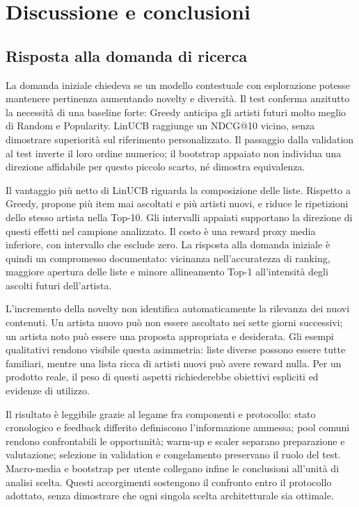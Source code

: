 \chapter{Discussione e conclusioni}\label{ch:conclusioni}
\section{Risposta alla domanda di ricerca}
La domanda iniziale chiedeva se un modello contestuale con esplorazione potesse mantenere pertinenza aumentando novelty e diversità. Il test conferma anzitutto la necessità di una baseline forte: Greedy anticipa gli artisti futuri molto meglio di Random e Popularity. LinUCB raggiunge un NDCG@10 vicino, senza dimostrare superiorità sul riferimento personalizzato. Il passaggio dalla validation al test inverte il loro ordine numerico; il bootstrap appaiato non individua una direzione affidabile per questo piccolo scarto, né dimostra equivalenza.

Il vantaggio più netto di LinUCB riguarda la composizione delle liste. Rispetto a Greedy, propone più item mai ascoltati e più artisti nuovi, e riduce le ripetizioni dello stesso artista nella Top-10. Gli intervalli appaiati supportano la direzione di questi effetti nel campione analizzato. Il costo è una reward proxy media inferiore, con intervallo che esclude zero. La risposta alla domanda iniziale è quindi un compromesso documentato: vicinanza nell'accuratezza di ranking, maggiore apertura delle liste e minore allineamento Top-1 all'intensità degli ascolti futuri dell'artista.

L'incremento della novelty non identifica automaticamente la rilevanza dei nuovi contenuti. Un artista nuovo può non essere ascoltato nei sette giorni successivi; un artista noto può essere una proposta appropriata e desiderata. Gli esempi qualitativi rendono visibile questa asimmetria: liste diverse possono essere tutte familiari, mentre una lista ricca di artisti nuovi può avere reward nulla. Per un prodotto reale, il peso di questi aspetti richiederebbe obiettivi espliciti ed evidenze di utilizzo.

Il risultato è leggibile grazie al legame fra componenti e protocollo: stato cronologico e feedback differito definiscono l'informazione ammessa; pool comuni rendono confrontabili le opportunità; warm-up e scaler separano preparazione e valutazione; selezione in validation e congelamento preservano il ruolo del test. Macro-media e bootstrap per utente collegano infine le conclusioni all'unità di analisi scelta. Questi accorgimenti sostengono il confronto entro il protocollo adottato, senza dimostrare che ogni singola scelta architetturale sia ottimale.

